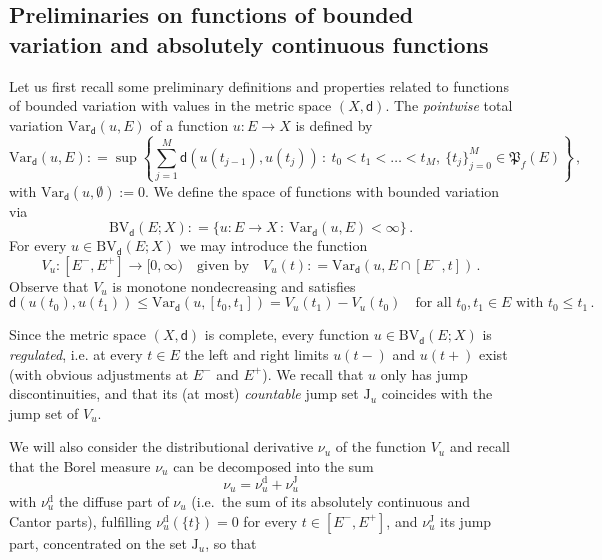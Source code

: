 \documentclass[a4paper,10pt,reqno]{amsart} %
\numberwithin{equation}{section}
\newcommand{\Xs}{X}
\newcommand{\BV}{\mathrm{BV}}
\newcommand{\mdn}{\mathsf{d}}
\newcommand{\md}[2]{\mathsf{d}(#1,#2)}
\newcommand{\Vars}[3]{\mathrm{Var}_{#1}(#2,#3)}
\newcommand{\Vari}[4]{\mathrm{Var}_{#1}(#2,[#3,#4])}
\newcommand{\Vf}[2]{V_{#1}(#2)}
\newcommand{\lli}[2]{{#1}({#2}{-})}
\newcommand{\rli}[2]{{#1}({#2}{+})}
\newcommand{\jump}[1]{\mathrm{J}_{#1}}
\newcommand{\mum}[2]{\nu_{#1}^{#2}}
\newcommand{\RRR}{\color{red}}
\begin{document}
\subsection{Preliminaries on functions of bounded variation and absolutely continuous functions}
\label{ss:2.1}
Let us first recall some preliminary definitions and properties related to functions of bounded variation with values in the metric space $(\Xs,\mdn)$. The \emph{pointwise} total variation $\Vars{\mdn}u{E}$ of a function $u:E \to \Xs$ is defined by
\begin{equation}
\label{def-tot-var}
\Vars{\mdn}u{E}: = \sup \left\{ \sum_{j=1}^M \md{u(t_{j-1})}{u(t_j)}\, : \ t_0<t_1<\ldots<t_M, \ \{ t_j\}_{j=0}^M \in \mathfrak{P}_f(E)\right\}\,,
\end{equation}
with 
$\Vars{\mdn}u{\emptyset}:=0$.
We define the space of functions with bounded variation via
\[
\BV_{\mdn}(E;X): = \{ u: E \to \Xs\, : \ \Vars{\mdn}u{E}<\infty\}\,.
\]
For every $u\in \BV_{\mdn}(E;X)$ we may introduce the function 
\begin{equation}
\label{def-variation-func}
V_u: [E^-,E^+]\to [0,\infty) \quad \text{given by} \quad
\Vf ut: = \Vars{\mdn}u{E \cap [ E^-,t]} \,.
\end{equation}
Observe that 
$V_u$ is monotone nondecreasing and satisfies
\[
\md{u(t_0)}{u(t_1)} \leq \Vari {\mdn}{u}{t_0}{t_1} = \Vf u{t_1}-  \Vf u{t_0} \quad \text{for all } t_0,t_1\in E \text{ with } t_0\leq t_1\,.
\]
\par
Since the metric space $(\Xs,\mdn)$ is complete, every function $u\in \BV_{\mdn}(E;X)$ is \emph{regulated}, i.e. at every $t\in E$ the left and right limits 
$\lli ut$ and $\rli ut$
exist (with obvious adjustments at $E^-$ and $E^+$). We recall that $u$ only has jump discontinuities, and that its (at most) \emph{countable} jump set $ \jump u$ coincides with the jump set of $V_u$. 
\par
 We will also consider the distributional derivative
 $\mum u{}$ of the function $V_u$ and recall that the Borel measure $\mum u {}$ can be decomposed into the sum
 \begin{equation}
 \label{decompose}
 \mum u{} =\mum u{\mathrm{d}} + \mum u{\mathrm{J}}  
 \end{equation}
with $\mum u{\mathrm{d}}$ the diffuse part of $\mum u{}$ (i.e.\ the sum of its absolutely continuous and Cantor parts), fulfilling $\mum u{\mathrm{d}}(\{t\})=0$ for every $t\in [E^-,E^+]$, and $\mum u{\mathrm{J}}$ its jump part, concentrated on the set $ \jump u$, so that 
\end{document}
